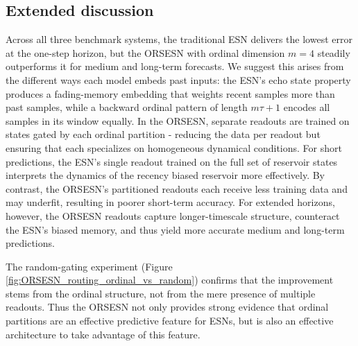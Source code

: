 \subsection{Extended discussion}

Across all three benchmark systems, the traditional ESN delivers the lowest error at the one-step horizon, but the ORSESN with ordinal dimension $m = 4$ steadily outperforms it for medium and long-term forecasts. We suggest this arises from the different ways each model embeds past inputs: the ESN's echo state property produces a fading-memory embedding that weights recent samples more than past samples, while a backward ordinal pattern of length $m\tau + 1$ encodes all samples in its window equally. In the ORSESN, separate readouts are trained on states gated by each ordinal partition - reducing the data per readout but ensuring that each specializes on homogeneous dynamical conditions. For short predictions, the ESN's single readout trained on the full set of reservoir states interprets the dynamics of the recency biased reservoir more effectively. By contrast, the ORSESN's partitioned readouts each receive less training data and may underfit, resulting in poorer short-term accuracy. For extended horizons, however, the ORSESN readouts capture longer-timescale structure, counteract the ESN's biased memory, and thus yield more accurate medium and long-term predictions.

The random-gating experiment (Figure \ref{fig:ORSESN_routing_ordinal_vs_random}) confirms that the improvement stems from the ordinal structure, not from the mere presence of multiple readouts. Thus the ORSESN not only provides strong evidence that ordinal partitions are an effective predictive feature for ESNs, but is also an effective architecture to take advantage of this feature.
